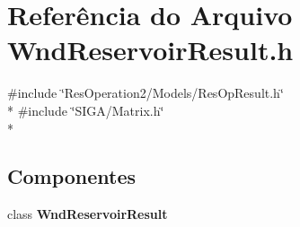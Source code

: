 \section{Referência do Arquivo Wnd\+Reservoir\+Result.\+h}
\label{_wnd_reservoir_result_8h}
{\ttfamily \#include \char`\"{}Res\+Operation2/\+Models/\+Res\+Op\+Result.\+h\char`\"{}}\\*
{\ttfamily \#include \char`\"{}S\+I\+G\+A/\+Matrix.\+h\char`\"{}}\\*
\subsection*{Componentes}
\begin{DoxyCompactItemize}
\item 
class {\bf Wnd\+Reservoir\+Result}
\end{DoxyCompactItemize}
